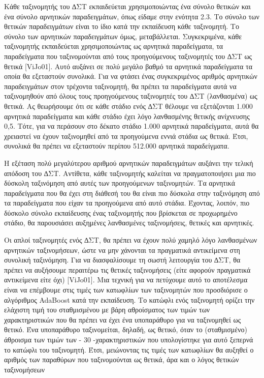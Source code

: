 Κάθε ταξινομητής του ∆ΣΤ εκπαιδεύεται χρησιμοποιώντας ένα σύνολο θετικών και ένα
σύνολο αρνητικών παραδειγμάτων, όπως είδαμε στην ενότητα 2.3. Το σύνολο των θετικών
παραδειγμάτων είναι το ίδιο κατά την εκπαίδευση κάθε ταξινομητή. Το σύνολο των αρνητικών
παραδειγμάτων όμως, μεταβάλλεται. Συγκεκριμένα, κάθε ταξινομητής εκπαιδεύεται
χρησιμοποιώντας ως αρνητικά παραδείγματα, τα παραδείγματα που ταξινομούνται από τους
προηγούμενους ταξινομητές του ∆ΣΤ ως θετικά [ViJo01]. Αυτό αυξάνει σε πολύ μεγάλο βαθμό τα
αρνητικά παραδείγματα τα οποία θα εξεταστούν συνολικά. Για να φτάσει ένας συγκεκριμένος
αριθμός αρνητικών παραδειγμάτων στον τρέχοντα ταξινομητή, θα πρέπει τα παραδείγματα αυτά
να ταξινομηθούν από όλους τους προηγούμενους ταξινομητές του ∆ΣΤ (λανθασμένα) ως θετικά.
Ας θεωρήσουμε ότι σε κάθε στάδιο ενός ∆ΣΤ θέλουμε να εξετάζονται 1.000 αρνητικά
παραδείγματα και κάθε στάδιο έχει λόγο λανθασμένης θετικής ανίχνευσης 0,5. Τότε, για να
περάσουν στο δέκατο στάδιο 1.000 αρνητικά παραδείγματα, αυτά θα χρειαστεί να έχουν
ταξινομηθεί από τα προηγούμενα εννιά στάδια ως θετικά. Έτσι, συνολικά θα πρέπει να εξεταστούν
περίπου 512.000 αρνητικά παραδείγματα.

Η εξέταση πολύ μεγαλύτερου αριθμού αρνητικών παραδειγμάτων αυξάνει την τελική απόδοση
του ∆ΣΤ. Αντίθετα, κάθε ταξινομητής καλείται να πραγματοποιήσει μια πιο δύσκολη ταξινόμηση
από αυτές των προηγούμενων ταξινομητών. Τα αρνητικά παραδείγματα που θα έχει στη διάθεσή
του θα είναι πιο δύσκολα στην ταξινόμηση από τα παραδείγματα που είχαν τα προηγούμενα από
αυτό στάδια. Έχοντας, λοιπόν, πιο δύσκολο σύνολο εκπαίδευσης ένας ταξινομητής που βρίσκεται
σε προχωρημένο στάδιο, θα παρουσιάσει αυξημένες λανθασμένες ταξινομήσεις, θετικές και
αρνητικές.

Οι απλοί ταξινομητές ενός ∆ΣΤ, θα πρέπει να έχουν πολύ χαμηλό λόγο λανθασμένων
αρνητικών ταξινομήσεων, ώστε να μην χάνονται τα πραγματικά αντικείμενα στη συνολική
ταξινόμηση. Για να διασφαλίσουμε τη σωστή λειτουργία του ∆ΣΤ, θα πρέπει να αυξήσουμε
περαιτέρω τις θετικές ταξινομήσεις (είτε αφορούν πραγματικά αντικείμενα είτε όχι) [ViJo01]. Μια
τεχνική για να πετύχουμε αυτό το αποτέλεσμα είναι να επέμβουμε στις τιμές των κατωφλίων των
ταξινομητών που προσδιόρισε ο αλγόριθμος AdaBoost κατά την εκπαίδευση. Το κατώφλι ενός
ταξινομητή ορίζει την ελάχιστη τιμή του σταθμισμένου με βάρη αθροίσματος των τιμών των
χαρακτηριστικών που θα πρέπει να έχει ένα υποπαράθυρο για να ταξινομηθεί ως θετικό. Ένα
υποπαράθυρο ταξινομείται, δηλαδή, ως θετικό, όταν το (σταθμισμένο) άθροισμα των τιμών των
- 30 -χαρακτηριστικών που υπολογίστηκε για αυτό ξεπερνά το κατώφλι του ταξινομητή. Έτσι,
μειώνοντας τις τιμές των κατωφλίων θα αυξηθεί ο αριθμός των παραθύρων που ταξινομούνται ως
θετικά, άρα και ο λόγος θετικών ταξινομήσεων

